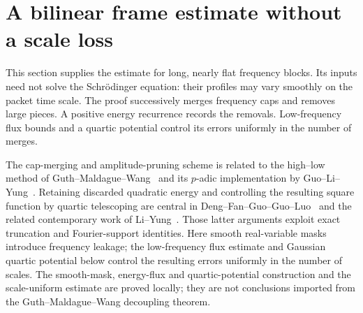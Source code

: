 \section{A bilinear frame estimate without a scale loss}
\label{sec:frame}

This section supplies the estimate for long, nearly flat frequency blocks.
Its inputs need not solve the Schr\"odinger equation: their profiles may
vary smoothly on the packet time scale.  The proof successively merges
frequency caps and removes large pieces.  A positive energy recurrence
records the removals. Low-frequency flux bounds and a quartic potential
control its errors uniformly in the number of merges.

The cap-merging and amplitude-pruning scheme is related to the high--low
method of Guth--Maldague--Wang~\cite[Sections~2.2--2.4 and~3.3]{GMW24}
and its $p$-adic implementation by Guo--Li--Yung~\cite[Section~7]{GLY23}.
Retaining discarded quadratic energy and controlling the resulting
square function by quartic telescoping are central in
Deng--Fan--Guo--Guo--Luo~\cite[Sections~4.2 and~6.2]{DFGGL26}
and the related contemporary work of
Li--Yung~\cite[Sections~5.2 and~5.5]{LiYung26}.
Those latter arguments exploit exact truncation and Fourier-support
identities. Here smooth real-variable masks introduce frequency leakage;
the low-frequency flux estimate and Gaussian quartic potential below
control the resulting errors uniformly in the number of scales.
The smooth-mask, energy-flux and quartic-potential construction and the
scale-uniform estimate are proved locally; they are not conclusions imported
from the Guth--Maldague--Wang decoupling theorem.

